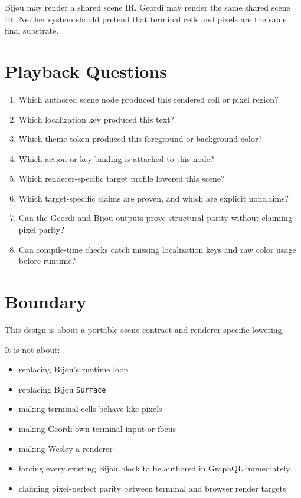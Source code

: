Bijou may render a shared scene IR. Geordi may render the same shared scene IR. Neither system should pretend that terminal cells and pixels are the same final substrate.

\section{Playback Questions}\label{record-138-playback-questions}

\begin{enumerate}
\def\labelenumi{\arabic{enumi}.}
\tightlist
\item
  Which authored scene node produced this rendered cell or pixel region?
\item
  Which localization key produced this text?
\item
  Which theme token produced this foreground or background color?
\item
  Which action or key binding is attached to this node?
\item
  Which renderer-specific target profile lowered this scene?
\item
  Which target-specific claims are proven, and which are explicit nonclaims?
\item
  Can the Geordi and Bijou outputs prove structural parity without claiming pixel parity?
\item
  Can compile-time checks catch missing localization keys and raw color usage before runtime?
\end{enumerate}

\section{Boundary}\label{record-138-boundary}

This design is about a portable scene contract and renderer-specific lowering.

It is not about:

\begin{itemize}
\tightlist
\item
  replacing Bijou's runtime loop
\item
  replacing Bijou \texttt{S\allowbreak{}u\allowbreak{}r\allowbreak{}f\allowbreak{}a\allowbreak{}c\allowbreak{}e}
\item
  making terminal cells behave like pixels
\item
  making Geordi own terminal input or focus
\item
  making Wesley a renderer
\item
  forcing every existing Bijou block to be authored in GraphQL immediately
\item
  claiming pixel-perfect parity between terminal and browser render targets
\end{itemize}

